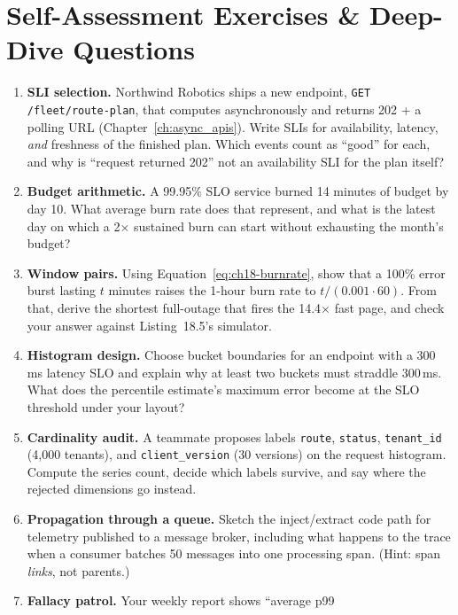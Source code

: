 \section{Self-Assessment Exercises \& Deep-Dive Questions}
\label{sec:ch18-exercises}

\begin{enumerate}
  \item \textbf{SLI selection.} Northwind Robotics ships a new endpoint,
        \texttt{GET /fleet/route-plan}, that computes asynchronously and
        returns 202 + a polling URL (Chapter~\ref{ch:async_apis}). Write
        SLIs for availability, latency, \emph{and} freshness of the
        finished plan. Which events count as ``good'' for each, and why is
        ``request returned 202'' not an availability SLI for the plan
        itself?
  \item \textbf{Budget arithmetic.} A 99.95\% SLO service burned 14 minutes
        of budget by day 10. What average burn rate does that represent,
        and what is the latest day on which a 2$\times$ sustained burn can
        start without exhausting the month's budget?
  \item \textbf{Window pairs.} Using Equation~\eqref{eq:ch18-burnrate},
        show that a 100\% error burst lasting $t$ minutes raises the 1-hour
        burn rate to $t / (0.001 \cdot 60)$. From that, derive the shortest
        full-outage that fires the 14.4$\times$ fast page, and check your
        answer against Listing~18.5's simulator.
  \item \textbf{Histogram design.} Choose bucket boundaries for an endpoint
        with a 300\,ms latency SLO and explain why at least two buckets
        must straddle 300\,ms. What does the percentile estimate's maximum
        error become at the SLO threshold under your layout?
  \item \textbf{Cardinality audit.} A teammate proposes labels
        \texttt{route}, \texttt{status}, \texttt{tenant\_id} (4{,}000
        tenants), and \texttt{client\_version} (30 versions) on the request
        histogram. Compute the series count, decide which labels survive,
        and say where the rejected dimensions go instead.
  \item \textbf{Propagation through a queue.} Sketch the inject/extract
        code path for telemetry published to a message broker, including
        what happens to the trace when a consumer batches 50 messages into
        one processing span. (Hint: span \emph{links}, not parents.)
  \item \textbf{Fallacy patrol.} Your weekly report shows ``average p99

\end{enumerate}
